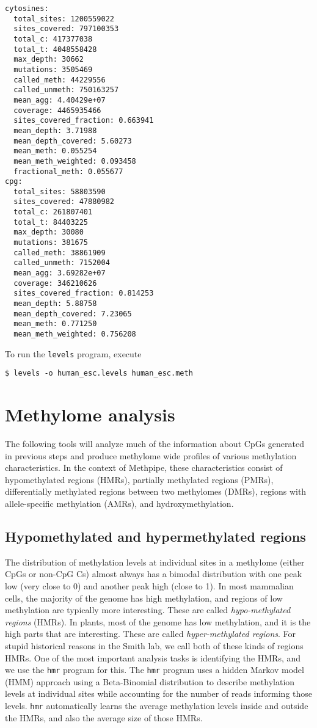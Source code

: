 \documentclass[10pt]{article}
\newcommand{\prog}[1]{\texttt{#1}}
\begin{document}
\begin{verbatim}
cytosines:
  total_sites: 1200559022
  sites_covered: 797100353
  total_c: 417377038
  total_t: 4048558428
  max_depth: 30662
  mutations: 3505469
  called_meth: 44229556
  called_unmeth: 750163257
  mean_agg: 4.40429e+07
  coverage: 4465935466
  sites_covered_fraction: 0.663941
  mean_depth: 3.71988
  mean_depth_covered: 5.60273
  mean_meth: 0.055254
  mean_meth_weighted: 0.093458
  fractional_meth: 0.055677
cpg:
  total_sites: 58803590
  sites_covered: 47880982
  total_c: 261807401
  total_t: 84403225
  max_depth: 30080
  mutations: 381675
  called_meth: 38861909
  called_unmeth: 7152004
  mean_agg: 3.69282e+07
  coverage: 346210626
  sites_covered_fraction: 0.814253
  mean_depth: 5.88758
  mean_depth_covered: 7.23065
  mean_meth: 0.771250
  mean_meth_weighted: 0.756208
\end{verbatim}

To run the \prog{levels} program, execute

\begin{verbatim}
$ levels -o human_esc.levels human_esc.meth
\end{verbatim}

\section{Methylome analysis}
\label{sec:high-level-analys}

The following tools will analyze much of the information about CpGs
generated in previous steps and produce methylome wide profiles of
various methylation characteristics. In the context of Methpipe, these
characteristics consist of hypomethylated regions (HMRs), partially
methylated regions (PMRs), differentially methylated regions between
two methylomes (DMRs), regions with allele-specific methylation (AMRs),
and hydroxymethylation.

\subsection{Hypomethylated and hypermethylated regions}
\label{sec:indent-hypo-methyl}

The distribution of methylation levels at individual sites in a
methylome (either CpGs or non-CpG Cs) almost always has a bimodal
distribution with one peak low (very close to 0) and another peak high
(close to 1). In most mammalian cells, the majority of the genome has
high methylation, and regions of low methylation are typically more
interesting. These are called {\em hypo-methylated regions} (HMRs). In
plants, most of the genome has low methylation, and it is the high
parts that are interesting. These are called {\em hyper-methylated
regions}. For stupid historical reasons in the Smith lab, we call
both of these kinds of regions HMRs. One of the most important
analysis tasks is identifying the HMRs, and we use the \prog{hmr}
program for this. The \prog{hmr} program uses a hidden Markov model
(HMM) approach using a Beta-Binomial distribution to describe
methylation levels at individual sites while accounting for the number
of reads informing those levels. \prog{hmr} automatically learns the
average methylation levels inside and outside the HMRs, and also the
average size of those HMRs.
\end{document}
